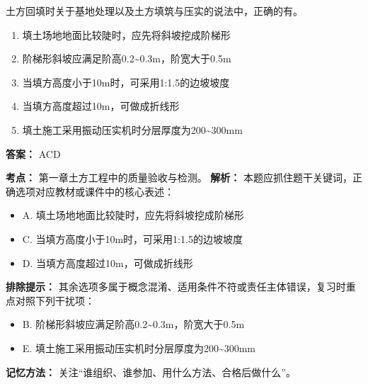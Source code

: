 \documentclass[UTF8,fontset=fandol,11pt]{ctexart}
\begin{document}
\begin{quizbox}[title={第 19 题}]
土方回填时关于基地处理以及土方填筑与压实的说法中，正确的有。\\
\begin{enumerate}[label=\Alph*.]
\item 填土场地地面比较陡时，应先将斜坡挖成阶梯形
\item 阶梯形斜坡应满足阶高0.2\textasciitilde{}0.3m，阶宽大于0.5m
\item 当填方高度小于10m时，可采用1:1.5的边坡坡度
\item 当填方高度超过10m，可做成折线形
\item 填土施工采用振动压实机时分层厚度为200\textasciitilde{}300mm
\end{enumerate}
\textbf{答案：} ACD
\vspace{0.25em}
\begin{answerbox}[title={考点解析}]
\textbf{考点：} 第一章土方工程中的质量验收与检测。
\textbf{解析：} 本题应抓住题干关键词，正确选项对应教材或课件中的核心表述：
\begin{itemize}
\item A. 填土场地地面比较陡时，应先将斜坡挖成阶梯形
\item C. 当填方高度小于10m时，可采用1:1.5的边坡坡度
\item D. 当填方高度超过10m，可做成折线形
\end{itemize}
\textbf{排除提示：} 其余选项多属于概念混淆、适用条件不符或责任主体错误，复习时重点对照下列干扰项：
\begin{itemize}
\item B. 阶梯形斜坡应满足阶高0.2\textasciitilde{}0.3m，阶宽大于0.5m
\item E. 填土施工采用振动压实机时分层厚度为200\textasciitilde{}300mm
\end{itemize}
\textbf{记忆方法：} 关注“谁组织、谁参加、用什么方法、合格后做什么”。
\end{answerbox}
\end{quizbox}

\vspace{0.2em}
\end{document}

